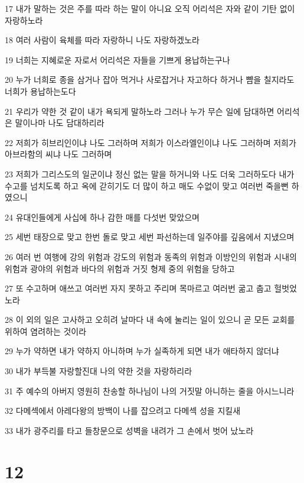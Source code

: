 \par 17 내가 말하는 것은 주를 따라 하는 말이 아니요 오직 어리석은 자와 같이 기탄 없이 자랑하노라
\par 18 여러 사람이 육체를 따라 자랑하니 나도 자랑하겠노라
\par 19 너희는 지혜로운 자로서 어리석은 자들을 기쁘게 용납하는구나
\par 20 누가 너희로 종을 삼거나 잡아 먹거나 사로잡거나 자고하다 하거나 뺨을 칠지라도 너희가 용납하는도다
\par 21 우리가 약한 것 같이 내가 욕되게 말하노라 그러나 누가 무슨 일에 담대하면 어리석은 말이나마 나도 담대하리라
\par 22 저희가 히브리인이냐 나도 그러하며 저희가 이스라엘인이냐 나도 그러하며 저희가 아브라함의 씨냐 나도 그러하며
\par 23 저희가 그리스도의 일군이냐 정신 없는 말을 하거니와 나도 더욱 그러하도다 내가 수고를 넘치도록 하고 옥에 갇히기도 더 많이 하고 매도 수없이 맞고 여러번 죽을뻔 하였으니
\par 24 유대인들에게 사십에 하나 감한 매를 다섯번 맞았으며
\par 25 세번 태장으로 맞고 한번 돌로 맞고 세번 파선하는데 일주야를 깊음에서 지냈으며
\par 26 여러 번 여행에 강의 위험과 강도의 위험과 동족의 위험과 이방인의 위험과 시내의 위험과 광야의 위험과 바다의 위험과 거짓 형제 중의 위험을 당하고
\par 27 또 수고하며 애쓰고 여러번 자지 못하고 주리며 목마르고 여러번 굶고 춥고 헐벗었노라
\par 28 이 외의 일은 고사하고 오히려 날마다 내 속에 눌리는 일이 있으니 곧 모든 교회를 위하여 염려하는 것이라
\par 29 누가 약하면 내가 약하지 아니하며 누가 실족하게 되면 내가 애타하지 않더냐
\par 30 내가 부득불 자랑할진대 나의 약한 것을 자랑하리라
\par 31 주 예수의 아버지 영원히 찬송할 하나님이 나의 거짓말 아니하는 줄을 아시느니라
\par 32 다메섹에서 아레다왕의 방백이 나를 잡으려고 다메섹 성을 지킬새
\par 33 내가 광주리를 타고 들창문으로 성벽을 내려가 그 손에서 벗어 났노라

\chapter{12}

